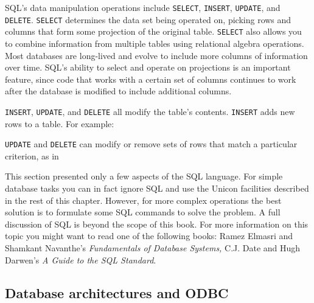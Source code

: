 SQL's data manipulation operations include
\texttt{SELECT}, \texttt{INSERT}, \texttt{UPDATE}, and \texttt{DELETE}.
\texttt{SELECT} determines the data set being operated on,
picking rows and columns that form some projection of the original
table. \texttt{SELECT} also allows you to combine
information from multiple tables using relational algebra operations.
Most databases are long-lived and evolve to include more columns of
information over time. SQL's ability to select and
operate on projections is an important feature, since code that works
with a certain set of columns continues to work after the database is
modified to include additional columns.

\texttt{INSERT}, \texttt{UPDATE}, and \texttt{DELETE} all modify the
table's contents. \texttt{INSERT} adds new rows to a
table. For example:


\texttt{UPDATE} and \texttt{DELETE} can modify or remove sets of rows
that match a particular criterion, as in


This section presented only a few aspects of the SQL language. For
simple database tasks you can in fact ignore SQL and use the Unicon
facilities described in the rest of this chapter. However, for more
complex operations the best solution is to formulate some SQL commands
to solve the problem. A full discussion of SQL is beyond the scope of
this book. For more information on this topic you might want to read
one of the following books: Ramez Elmasri and Shamkant
Navanthe's \textit{Fundamentals of Database Systems,}
C.J. Date and Hugh Darwen's \textit{A Guide to the SQL Standard}.

\subsection*{Database architectures and ODBC}

